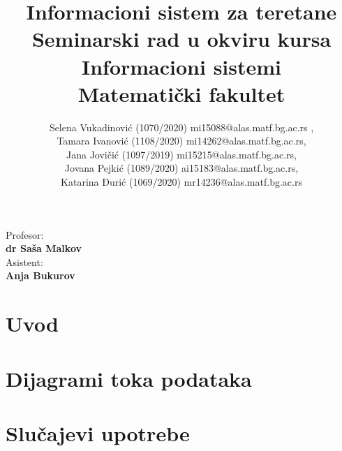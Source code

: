 \documentclass[a4paper]{article}
\begin{document}
\title{Informacioni sistem za teretane\\ \small{Seminarski rad u okviru kursa\\Informacioni sistemi\\ Matematički fakultet}}

\author{Selena Vukadinović (1070/2020) mi15088@alas.matf.bg.ac.rs ,\\ Tamara Ivanović (1108/2020) mi14262@alas.matf.bg.ac.rs,\\ Jana Jovičić (1097/2019) mi15215@alas.matf.bg.ac.rs, \\Jovana Pejkić (1089/2020) ai15183@alas.matf.bg.ac.rs, \\ Katarina Đurić (1069/2020) mr14236@alas.matf.bg.ac.rs}


\maketitle


\vfill

\begin{flushleft}
Profesor:\\
\textbf{dr Saša Malkov}\\[.3cm] %
Asistent:\\
\textbf{Anja Bukurov}\\[.3cm] %
\end{flushleft}

\newpage

\tableofcontents
\newpage


\section{Uvod}
\label{sec:uvod}



\section{Dijagrami toka podataka}



\section{Slučajevi upotrebe}


\end{document}
